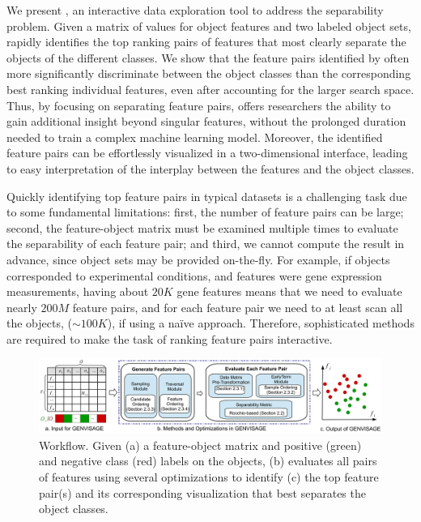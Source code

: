 We present \genviz,
an interactive data exploration tool to address the separability problem.
Given a matrix of values for object features
and two labeled object sets, \genviz rapidly identifies
the top ranking pairs of features
that most clearly separate the objects of
the different classes.
We show that the feature pairs identified by \genviz often more significantly
discriminate between the object classes than the corresponding
best ranking individual features, even after accounting for the larger search space.
Thus, by focusing on separating feature pairs, \genviz
offers researchers the ability to gain additional
insight beyond singular features, without the prolonged duration
needed to train a complex machine learning model.
Moreover, the identified feature pairs can be effortlessly
visualized in a two-dimensional interface,
leading to easy interpretation of
the interplay between the features and the object classes.

Quickly identifying top feature pairs
in typical datasets
is a challenging task due to some fundamental limitations:
first, the number of feature pairs can be large;
second, the feature-object matrix must be examined
multiple times to evaluate the separability of
each feature pair;
and third, we cannot compute the result in advance, since
object sets may be provided on-the-fly.
For example, if objects corresponded to experimental
conditions, and features were gene expression measurements,
having about $20K$ gene features
means that we need to evaluate nearly $200M$ feature pairs,
and for each feature pair we need to at least scan all the objects,
($\sim100K$), if using a na\"ive approach.
Therefore, sophisticated methods are required
to make the task of ranking feature pairs interactive.

\begin{figure}[t]
 \centering
 \includegraphics[width=0.9\linewidth]{fig/workflow2.pdf}
 \vspace{-10pt}
\caption{\genviz Workflow.
Given (a) a feature-object matrix and positive (green) and negative class (red) labels on the objects, \genviz (b) evaluates all pairs of features using several optimizations to identify (c) the top feature pair(s) and its corresponding visualization that best separates the object classes.}
\label{fig:workflow}
\vspace{-15pt}
\end{figure}


